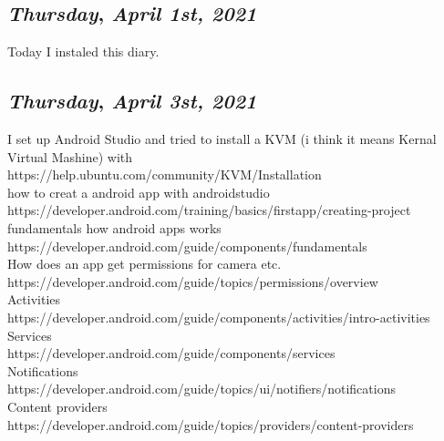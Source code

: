 \begin{center}
\section*{\month}
\end{center}

\def\day{\textit{April 1st, 2021}}
\def\weekday{\textit{Thursday}}
\subsection*{\weekday, \day}
Today I instaled this diary. 

\def\day{\textit{April 3st, 2021}}
\def\weekday{\textit{Thursday}}
\subsection*{\weekday, \day}

I set up Android Studio and tried to install a KVM (i think it means Kernal Virtual Mashine) with \\
https://help.ubuntu.com/community/KVM/Installation\\

how to creat a android app with androidstudio \\
https://developer.android.com/training/basics/firstapp/creating-project \\ 

fundamentals how android apps works \\
https://developer.android.com/guide/components/fundamentals \\ 

How does an app get permissions for camera etc.\\ 
https://developer.android.com/guide/topics/permissions/overview\\

Activities\\
https://developer.android.com/guide/components/activities/intro-activities\\

Services\\
https://developer.android.com/guide/components/services\\

Notifications\\
https://developer.android.com/guide/topics/ui/notifiers/notifications\\

Content providers\\
https://developer.android.com/guide/topics/providers/content-providers\\

